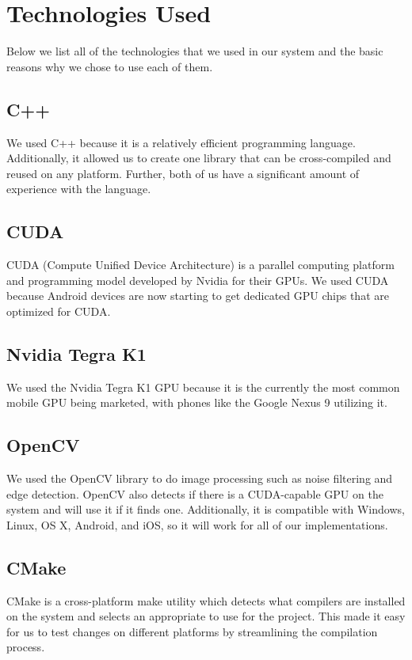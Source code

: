 \chapter{Technologies Used}
\label{technologies}

Below we list all of the technologies that we used in our system and the basic reasons why we chose to use each of them.

\section{C++}

We used C++ because it is a relatively efficient programming language. Additionally, it allowed us to create one library that can be cross-compiled and reused on any platform. Further, both of us have a significant amount of experience with the language.

\section{CUDA}

CUDA (Compute Unified Device Architecture) is a parallel computing platform and programming model developed by Nvidia for their GPUs. We used CUDA because Android devices are now starting to get dedicated GPU chips that are optimized for CUDA.

\section{Nvidia Tegra K1}

We used the Nvidia Tegra K1 GPU because it is the currently the most common mobile GPU being marketed, with phones like the Google Nexus 9 utilizing it.

\section{OpenCV}

We used the OpenCV library to do image processing such as noise filtering and edge detection. 
OpenCV also detects if there is a CUDA-capable GPU on the system and will use it if it finds one.
Additionally, it is compatible with Windows, Linux, OS X, Android, and iOS, so it will work for all of our implementations.

\section{CMake}

CMake is a cross-platform make utility which detects what compilers are installed on the system and selects an appropriate to use for the project. This made it easy for us to test changes on different platforms by streamlining the compilation process.